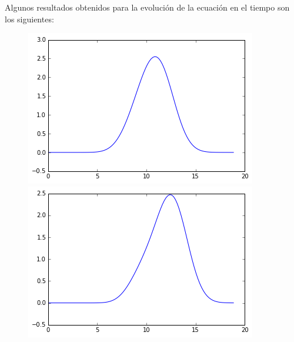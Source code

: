 \documentclass[spanish, fleqn]{article}
\begin{document}
    Algunos resultados obtenidos para la evolución de la ecuación en el tiempo son los siguientes: \\
    \begin{figure}[H]
      \centering
      \begin{minipage}{.5\textwidth}
        \centering
        \includegraphics[scale=0.6]{t1000.png}
      \end{minipage}%
      \begin{minipage}{.5\textwidth}
        \centering
        \includegraphics[scale=0.6]{t2000.png}
      \end{minipage}
    \end{figure}
\end{document}
